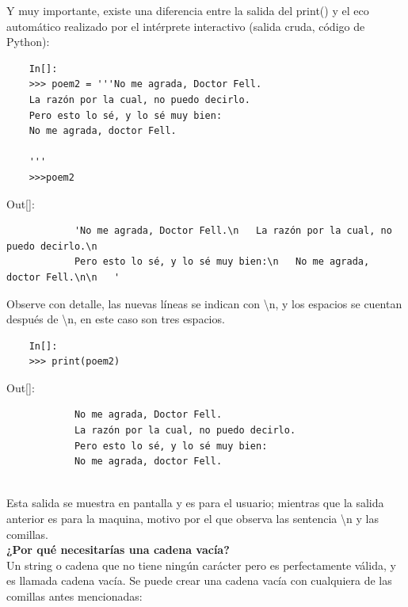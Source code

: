 Y muy importante, existe una diferencia entre la salida del {\ttfamily print()} y el eco automático
realizado por el intérprete interactivo (salida cruda, código de Python):

\begin{lstlisting}
	In[]:
	>>> poem2 = '''No me agrada, Doctor Fell.
	La razón por la cual, no puedo decirlo.
	Pero esto lo sé, y lo sé muy bien:
	No me agrada, doctor Fell.
	
	'''
	>>>poem2
\end{lstlisting}


{\ttfamily\scriptsize\scriptsize 
	\hspace{-0.65cm}Out[]:\vspace{-0.15cm}	
	{\color{blue} 	
		\begin{verbatim}
			'No me agrada, Doctor Fell.\n   La razón por la cual, no puedo decirlo.\n
			Pero esto lo sé, y lo sé muy bien:\n   No me agrada, doctor Fell.\n\n   '
		\end{verbatim}
}}
\noindent Observe con detalle, las nuevas líneas se indican con {\ttfamily \textbackslash n}, y los espacios se cuentan después de {\ttfamily \textbackslash n}, en este caso son tres espacios. 

\begin{lstlisting}
	In[]:	
	>>> print(poem2) 
\end{lstlisting}

{\ttfamily\scriptsize\scriptsize 
	\hspace{-0.65cm}Out[]:\vspace{-0.15cm}	
	{\color{blue} 	
		\begin{verbatim}		
			No me agrada, Doctor Fell.
			La razón por la cual, no puedo decirlo.
			Pero esto lo sé, y lo sé muy bien:
			No me agrada, doctor Fell.
			
		\end{verbatim}
}} 

\noindent Esta salida se muestra en pantalla y es para el usuario; mientras que la salida anterior es para la maquina, motivo por el que observa las sentencia  {\ttfamily \textbackslash n} y las comillas.\\




{\bf ¿Por qué necesitarías una cadena vacía?}\\

Un string o cadena que no tiene ningún carácter pero es perfectamente válida, y es llamada cadena vacía. Se puede crear una cadena vacía con cualquiera de las comillas antes mencionadas:

